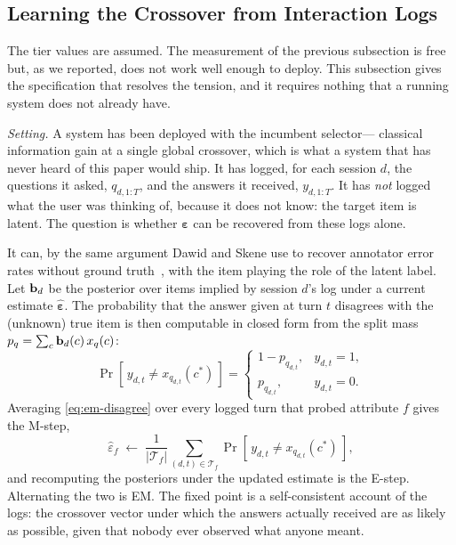 \subsection{Learning the Crossover from Interaction Logs}
\label{sec:reliability-em}

The tier values are assumed. The measurement of the previous subsection is free
but, as we reported, does not work well enough to deploy. This subsection gives
the specification that resolves the tension, and it requires nothing that a
running system does not already have.

\emph{Setting.} A system has been deployed with the incumbent selector---
classical information gain at a single global crossover, which is what a system
that has never heard of this paper would ship. It has logged, for each session
$d$, the questions it asked, $q_{d,1:T}$, and the answers it received,
$y_{d,1:T}$. It has \emph{not} logged what the user was thinking of, because it
does not know: the target item is latent. The question is whether
$\boldsymbol\varepsilon$ can be recovered from these logs alone.

It can, by the same argument Dawid and Skene use to recover annotator error
rates without ground truth~\cite{dawid1979}, with the item playing the role of
the latent label. Let $\mathbf{b}_d$ be the posterior over items implied by session
$d$'s log under a current estimate $\hat{\boldsymbol\varepsilon}$. The
probability that the answer given at turn $t$ disagrees with the (unknown) true
item is then computable in closed form from the split mass
$p_{q} = \sum_c \mathbf{b}_d(c)\,x_{q}(c)$:
\begin{equation}
\Pr\!\left[\,y_{d,t} \neq x_{q_{d,t}}(c^\ast)\,\right] =
\begin{cases} 1 - p_{q_{d,t}}, & y_{d,t} = 1,\\ p_{q_{d,t}}, & y_{d,t} = 0.\end{cases}
\label{eq:em-disagree}
\end{equation}
Averaging \eqref{eq:em-disagree} over every logged turn that probed attribute
$f$ gives the M-step,
\begin{equation}
\hat\varepsilon_f \;\leftarrow\;
\frac{1}{|\mathcal{T}_f|}\sum_{(d,t)\in\mathcal{T}_f}
  \Pr\!\left[\,y_{d,t} \neq x_{q_{d,t}}(c^\ast)\,\right],
\label{eq:em-mstep}
\end{equation}
and recomputing the posteriors under the updated estimate is the E-step.
Alternating the two is EM. The fixed point is a self-consistent account of the
logs: the crossover vector under which the answers actually received are as
likely as possible, given that nobody ever observed what anyone meant.

